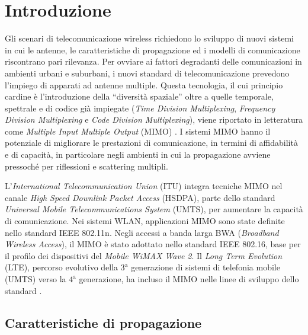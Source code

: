 \documentclass[technote]{IEEEtran}
\begin{document}
\section{Introduzione}

\par Gli scenari di telecomunicazione wireless richiedono lo sviluppo di nuovi sistemi in cui le antenne, le caratteristiche di propagazione ed i modelli di comunicazione riscontrano pari rilevanza. Per ovviare ai fattori degradanti delle comunicazioni in ambienti urbani e suburbani, i nuovi standard di telecomunicazione prevedono l'impiego di apparati ad antenne multiple. Questa tecnologia, il cui principio cardine è l'introduzione della ``diversità  spaziale'' oltre a quelle temporale, spettrale e di codice già impiegate (\textit{Time Division Multiplexing}, \textit{Frequency Division Multiplexing} e \textit{Code Division Multiplexing}), viene riportato in letteratura come \textit{Multiple Input Multiple Output} (MIMO) \cite{Jensen, DeFlavis}. I sistemi MIMO hanno il potenziale di migliorare le prestazioni di comunicazione, in termini di affidabilità  e di capacità, in particolare negli ambienti in cui la propagazione avviene pressoché per riflessioni e scattering multipli.
\par L'\textit{International Telecommunication Union} (ITU) integra tecniche MIMO nel canale \textit{High Speed Downlink Packet Access} (HSDPA),  parte dello standard \textit{Universal Mobile Telecommunications System} (UMTS), per aumentare la capacità di comunicazione. Nei sistemi WLAN, applicazioni MIMO sono state definite nello standard IEEE 802.11n. Negli accessi a banda larga BWA (\textit{Broadband Wireless Access}), il MIMO è stato adottato nello standard IEEE 802.16, base per il profilo dei dispositivi del \textit{Mobile WiMAX Wave 2}. Il \textit{Long Term Evolution} (LTE), percorso evolutivo della $3^\mathrm{a}$ generazione di sistemi di telefonia mobile (UMTS) verso la $4^\mathrm{a}$ generazione, ha incluso il MIMO nelle linee di sviluppo dello standard \cite{AgilentAN1}.


\subsection*{Caratteristiche di propagazione}
\end{document}
